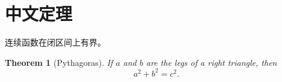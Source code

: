 \documentclass{article}
\newtheorem{theorem}{Theorem}
\begin{document}
\section{中文定理}
连续函数在闭区间上有界。
\begin{theorem}[Pythagoras]
If $a$ and $b$ are the legs of a right triangle, then
\[
a^2+b^2=c^2.
\]
\end{theorem}
\end{document}
